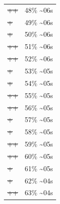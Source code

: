 \documentclass[12pt]{article}
\begin{document}
\begin{center}
\begin{tabular}{ll}
\sout{\sout{\sout{\sout{\sout{\sout{\sout{\sout{\sout{\sout{\sout{++}}}}}}}}}}} & 48\% \textasciitilde{}06s\\
\sout{\sout{\sout{\sout{\sout{\sout{\sout{\sout{\sout{\sout{\sout{\sout{+}}}}}}}}}}}} & 49\% \textasciitilde{}06s\\
\sout{\sout{\sout{\sout{\sout{\sout{\sout{\sout{\sout{\sout{\sout{\sout{+}}}}}}}}}}}} & 50\% \textasciitilde{}06s\\
\sout{\sout{\sout{\sout{\sout{\sout{\sout{\sout{\sout{\sout{\sout{\sout{++}}}}}}}}}}}} & 51\% \textasciitilde{}06s\\
\sout{\sout{\sout{\sout{\sout{\sout{\sout{\sout{\sout{\sout{\sout{\sout{++}}}}}}}}}}}} & 52\% \textasciitilde{}06s\\
\sout{\sout{\sout{\sout{\sout{\sout{\sout{\sout{\sout{\sout{\sout{\sout{\sout{+}}}}}}}}}}}}} & 53\% \textasciitilde{}05s\\
\sout{\sout{\sout{\sout{\sout{\sout{\sout{\sout{\sout{\sout{\sout{\sout{\sout{+}}}}}}}}}}}}} & 54\% \textasciitilde{}05s\\
\sout{\sout{\sout{\sout{\sout{\sout{\sout{\sout{\sout{\sout{\sout{\sout{\sout{++}}}}}}}}}}}}} & 55\% \textasciitilde{}05s\\
\sout{\sout{\sout{\sout{\sout{\sout{\sout{\sout{\sout{\sout{\sout{\sout{\sout{++}}}}}}}}}}}}} & 56\% \textasciitilde{}05s\\
\sout{\sout{\sout{\sout{\sout{\sout{\sout{\sout{\sout{\sout{\sout{\sout{\sout{\sout{+}}}}}}}}}}}}}} & 57\% \textasciitilde{}05s\\
\sout{\sout{\sout{\sout{\sout{\sout{\sout{\sout{\sout{\sout{\sout{\sout{\sout{\sout{+}}}}}}}}}}}}}} & 58\% \textasciitilde{}05s\\
\sout{\sout{\sout{\sout{\sout{\sout{\sout{\sout{\sout{\sout{\sout{\sout{\sout{\sout{++}}}}}}}}}}}}}} & 59\% \textasciitilde{}05s\\
\sout{\sout{\sout{\sout{\sout{\sout{\sout{\sout{\sout{\sout{\sout{\sout{\sout{\sout{++}}}}}}}}}}}}}} & 60\% \textasciitilde{}05s\\
\sout{\sout{\sout{\sout{\sout{\sout{\sout{\sout{\sout{\sout{\sout{\sout{\sout{\sout{\sout{+}}}}}}}}}}}}}}} & 61\% \textasciitilde{}05s\\
\sout{\sout{\sout{\sout{\sout{\sout{\sout{\sout{\sout{\sout{\sout{\sout{\sout{\sout{\sout{+}}}}}}}}}}}}}}} & 62\% \textasciitilde{}04s\\
\sout{\sout{\sout{\sout{\sout{\sout{\sout{\sout{\sout{\sout{\sout{\sout{\sout{\sout{\sout{++}}}}}}}}}}}}}}} & 63\% \textasciitilde{}04s\\

\end{tabular}
\end{center}
\end{document}

